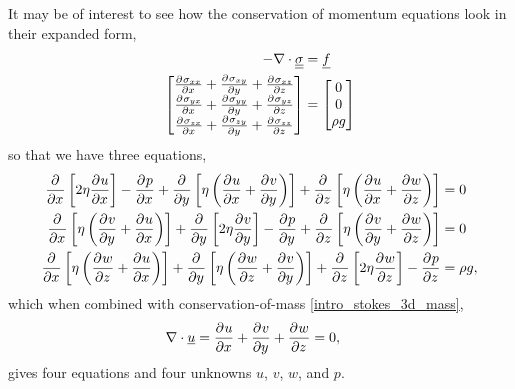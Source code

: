 It may be of interest to see how the conservation of momentum equations look in their expanded form,
\begin{align*}
  -\nabla \cdot \underline{\underline{\sigma}} &= \underline{f} \\
  \begin{bmatrix}
    \frac{\partial{^{}} \sigma_{xx}}{\partial x{^{}} } + \frac{\partial{^{}} \sigma_{xy}}{\partial y{^{}} } + \frac{\partial{^{}} \sigma_{xz}}{\partial z{^{}} } \\ 
    \frac{\partial{^{}} \sigma_{yx}}{\partial x{^{}} } + \frac{\partial{^{}} \sigma_{yy}}{\partial y{^{}} } + \frac{\partial{^{}} \sigma_{yz}}{\partial z{^{}} } \\ 
    \frac{\partial{^{}} \sigma_{zx}}{\partial x{^{}} } + \frac{\partial{^{}} \sigma_{zy}}{\partial y{^{}} } + \frac{\partial{^{}} \sigma_{zz}}{\partial z{^{}} } \\ 
  \end{bmatrix} &=
  \begin{bmatrix}
    0 \\ 0 \\ \rho g
  \end{bmatrix}
\end{align*}
so that we have three equations,
{\tiny
\begin{subequations}
  \label{3d_stokes_expanded}
  \begin{align} 
    \label{3d_stokes_expanded_one}
    \parder{}{x} \left[2\eta \parder{u}{x} \right]  - \parder{p}{x} + \parder{}{y} \left[\eta \left( \parder{u}{x} + \parder{v}{y} \right) \right] + \parder{}{z} \left[\eta \left( \parder{u}{x} + \parder{w}{z} \right) \right] &= 0 \\ 
    \label{3d_stokes_expanded_two} 
    \parder{}{x} \left[\eta \left( \parder{v}{y} + \parder{u}{x} \right) \right]  + \parder{}{y} \left[2\eta \parder{v}{y} \right] - \parder{p}{y} + \parder{}{z} \left[\eta \left( \parder{v}{y} + \parder{w}{z} \right) \right] &= 0 \\ 
    \label{3d_stokes_expanded_three}
    \parder{}{x} \left[\eta \left( \parder{w}{z} + \parder{u}{x} \right) \right]  + \parder{}{y} \left[\eta \left( \parder{w}{z} + \parder{v}{y} \right) \right] + \parder{}{z} \left[2\eta \parder{w}{z} \right] - \parder{p}{z} &= \rho g,
  \end{align}
\end{subequations}}
which when combined with conservation-of-mass \cref{intro_stokes_3d_mass},
\begin{align}
  \label{3d_stokes_expanded_four}
  \nabla \cdot \rankone{u} &= \parder{u}{x} + \parder{v}{y} + \parder{w}{z} = 0,
\end{align}
gives four equations and four unknowns $u$, $v$, $w$, and $p$.

